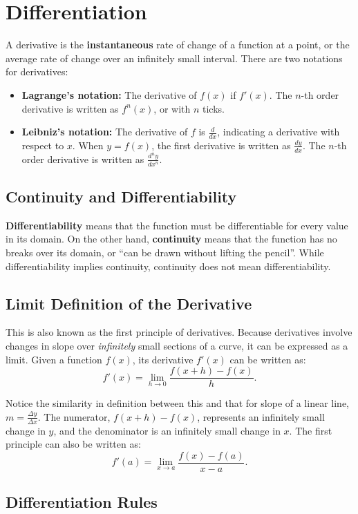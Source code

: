\section{Differentiation}
A derivative is the \textbf{instantaneous} rate of change of a function at a point, or the average rate of change over an infinitely small interval. There are two notations for derivatives:

\begin{itemize}
	\item \textbf{Lagrange's notation:} The derivative of $f(x)$ if $f'(x)$. The $n$-th order derivative is written as $f^n(x)$, or with $n$ ticks.
	\item \textbf{Leibniz's notation:} The derivative of $f$ is $\frac{d}{dx}$, indicating a derivative with respect to $x$. When $y = f(x)$,  the first derivative is written as $\frac{dy}{dx}$. The $n$-th order derivative is written as $\frac{d^n y}{dx^n}$.
\end{itemize}

\subsection{Continuity and Differentiability}
\textbf{Differentiability} means that the function must be differentiable for every value in its domain. On the other hand, \textbf{continuity} means that the function has no breaks over its domain, or ``can be drawn without lifting the pencil''. While differentiability implies continuity, continuity does not mean differentiability.

\subsection{Limit Definition of the Derivative}
This is also known as the first principle of derivatives. Because derivatives involve changes in slope over \textit{infinitely} small sections of a curve, it can be expressed as a limit. Given a function $f(x)$, its derivative $f'(x)$ can be written as:
\[ f'(x) = \lim_{h \to 0} \frac{f(x + h) - f(x)}{h}. \]

Notice the similarity in definition between this and that for slope of a linear line, $m = \frac{\Delta y}{\Delta x}$. The numerator, $f(x + h) - f(x)$, represents an infinitely small change in $y$, and the denominator is an infinitely small change in $x$. The first principle can also be written as:
\[ f'(a) = \lim_{x \to a} \frac{f(x) - f(a)}{x - a}. \]

\subsection{Differentiation Rules}


